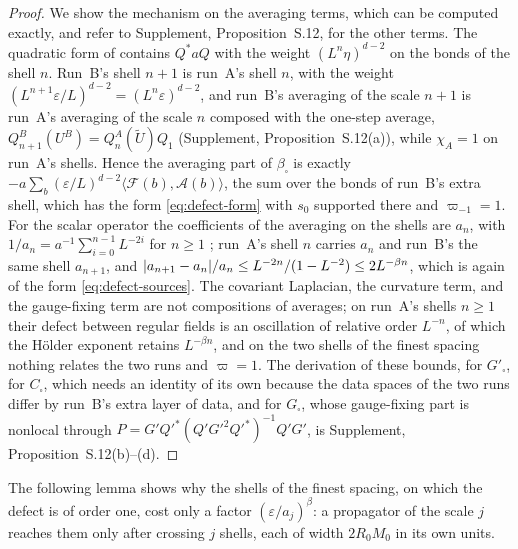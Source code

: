 \documentclass[11pt]{preprint}
\DeclarePairedDelimiter{\abs}{\lvert}{\rvert}
\numberwithin{equation}{section}
\theoremstyle{definition}
\theoremstyle{remark}
\theoremstyle{plain}
\begin{document}
\begin{proof}
We show the mechanism on the averaging terms, which can be computed exactly, and refer to Supplement, Proposition~S.12, for the other terms. The quadratic form of \cite[(3.16)]{BalabanPBG} contains $Q^*aQ$ with the weight $(L^n\eta)^{d-2}$ on the bonds of the shell $n$. Run~B's shell $n + 1$ is run~A's shell $n$, with the weight $(L^{n+1}\varepsilon/L)^{d-2} = (L^n\varepsilon)^{d-2}$, and run~B's averaging of the scale $n + 1$ is run~A's averaging of the scale $n$ composed with the one-step average, $Q^B_{n+1}(U^B) = Q^A_n(\tilde U)Q_1$ (Supplement, Proposition~S.12(a)), while $\chi_A = 1$ on run~A's shells. Hence the averaging part of $\beta_\square$ is exactly $-a\sum_b(\varepsilon/L)^{d-2}\langle\mathcal F(b), \mathcal A(b)\rangle$, the sum over the bonds of run~B's extra shell, which has the form \eqref{eq:defect-form} with $s_0$ supported there and $\varpi_{-1} = 1$. For the scalar operator the coefficients of the averaging on the shells are $a_n$, with $1/a_n = a^{-1}\sum_{i=0}^{n-1}L^{-2i}$ for $n \geq 1$ \cite[p.~394]{BalabanPBG}; run~A's shell $n$ carries $a_n$ and run~B's the same shell $a_{n+1}$, and $\abs{a_{n+1} - a_n}/a_n \leq L^{-2n}/(1 - L^{-2}) \leq 2L^{-\beta n}$, which is again of the form \eqref{eq:defect-sources}. The covariant Laplacian, the curvature term, and the gauge-fixing term are not compositions of averages; on run~A's shells $n \geq 1$ their defect between regular fields is an oscillation of relative order $L^{-n}$, of which the H\"older exponent retains $L^{-\beta n}$, and on the two shells of the finest spacing nothing relates the two runs and $\varpi = 1$. The derivation of these bounds, for $G'_\square$, for $C_\square$, which needs an identity of its own because the data spaces of the two runs differ by run~B's extra layer of data, and for $G_\square$, whose gauge-fixing part is nonlocal through $P = G'Q'^*(Q'G'^2Q'^*)^{-1}Q'G'$, is Supplement, Proposition~S.12(b)--(d).
\end{proof}

The following lemma shows why the shells of the finest spacing, on which the defect is of order one, cost only a factor $(\varepsilon/a_j)^\beta$: a propagator of the scale $j$ reaches them only after crossing $j$ shells, each of width $2R_0M_0$ in its own units.
\end{document}
